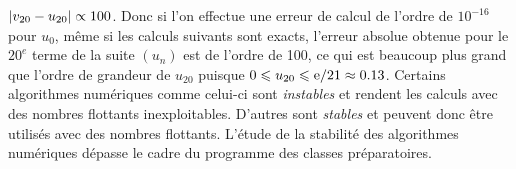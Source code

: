 \documentclass{magnolia}
\begin{document}
$\left|v_{20}-u_{20}\right|\propto 100$. Donc si l'on effectue une erreur de calcul de l'ordre de
$10^{-16}$ pour $u_0$, même si les calculs suivants sont exacts, l'erreur absolue
obtenue pour le $20^e$ terme de la suite $(u_n)$ est de l'ordre de 100, ce qui
est beaucoup plus grand que l'ordre de grandeur de $u_{20}$ puisque $0\leqslant u_{20}\leqslant {\rm e}/21\approx 0.13$. Certains
algorithmes numériques comme celui-ci sont \emph{instables} et rendent les calculs avec
des nombres flottants inexploitables. D'autres sont \emph{stables} et peuvent donc
être utilisés avec des nombres flottants. L'étude de la stabilité des algorithmes
numériques dépasse le cadre du programme des classes préparatoires.





\end{document}
